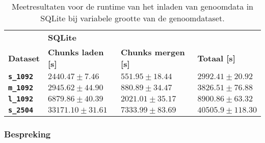 \begin{table}[h]
\centering
\begin{tabular}{@{}llll@{}}
\cmidrule(l){2-4}
                              & \multicolumn{3}{|l|}{\textbf{SQLite}}                             \\ 
\cmidrule(l){1-4}
\multicolumn{1}{|l|}{\textbf{Dataset}}  & \multicolumn{1}{l|}{\textbf{Chunks laden [s]}} & \multicolumn{1}{l|}{\textbf{Chunks mergen [s]}} & \multicolumn{1}{l|}{\textbf{Totaal [s]}} \\ \midrule
\multicolumn{1}{|l|}{\textbf{\texttt{s\_1092}}} &    \multicolumn{1}{l|}{$2440.47 \pm 7.46$}         & \multicolumn{1}{l|}{$551.95 \pm 18.44$}          & \multicolumn{1}{l|}{$2992.41 \pm 20.92$}                          \\
\multicolumn{1}{|l|}{\textbf{\texttt{m\_1092}}} &    \multicolumn{1}{l|}{$2945.62 \pm 44.90$}       & \multicolumn{1}{l|}{$880.89 \pm 34.47$}          & \multicolumn{1}{l|}{$3826.51 \pm 76.88$}                          \\
\multicolumn{1}{|l|}{\textbf{\texttt{l\_1092}}} &    \multicolumn{1}{l|}{$6879.86 \pm 40.39$}       & \multicolumn{1}{l|}{$2021.01 \pm 35.17$}          & \multicolumn{1}{l|}{$8900.86 \pm 63.32$}                          \\
\multicolumn{1}{|l|}{\textbf{\texttt{s\_2504}}} &    \multicolumn{1}{l|}{$33171.10 \pm 31.61$}       & \multicolumn{1}{l|}{$7333.99 \pm 83.69$}          & \multicolumn{1}{l|}{$40505.9 \pm 118.30$}                          \\
\bottomrule
\end{tabular}
\caption{Meetresultaten voor de runtime van het inladen van genoomdata in SQLite bij variabele grootte van de genoomdataset.}
\end{table}

\newpage
\subsubsection{Bespreking}

